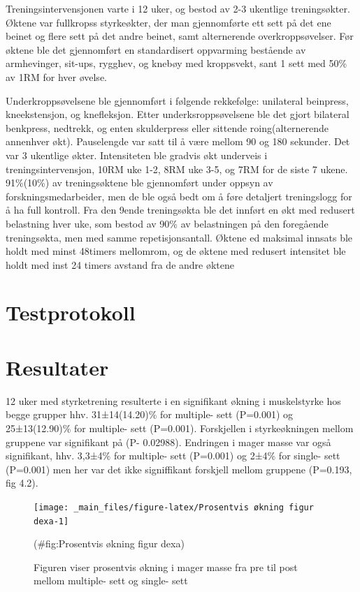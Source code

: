 \documentclass[
]{book}
\begin{document}
Treningsintervensjonen varte i 12 uker, og bestod av 2-3 ukentlige treningsøkter. Øktene var fullkropss styrkeøkter, der man gjennomførte ett sett på det ene beinet og flere sett på det andre beinet, samt alternerende overkroppsøvelser. Før øktene ble det gjennomført en standardisert oppvarming bestående av armhevinger, sit-ups, rygghev, og knebøy med kroppsvekt, sant 1 sett med 50\% av 1RM for hver øvelse.

Underkroppsøvelsene ble gjennomført i følgende rekkefølge: unilateral beinpress, kneekstensjon, og knefleksjon. Etter underksroppsøvelsene ble det gjort bilateral benkpress, nedtrekk, og enten skulderpress eller sittende roing(alternerende annenhver økt). Pauselengde var satt til å være mellom 90 og 180 sekunder. Det var 3 ukentlige økter. Intensiteten ble gradvis økt underveis i treningsintervensjon, 10RM uke 1-2, 8RM uke 3-5, og 7RM for de siste 7 ukene. 91\%(10\%) av treningsøktene ble gjennomført under oppsyn av forskningsmedarbeider, men de ble også bedt om å føre detaljert treningslogg for å ha full kontroll. Fra den 9ende treningsøkta ble det innført en økt med redusert belastning hver uke, som bestod av 90\% av belastningen på den foregående treningsøkta, men med samme repetisjonsantall. Øktene ed maksimal innsats ble holdt med minst 48timers mellomrom, og de øktene med redusert intensitet ble holdt med inst 24 timers avstand fra de andre øktene

\hypertarget{testprotokoll}{%
\section{Testprotokoll}\label{testprotokoll}}

\hypertarget{resultater-1}{%
\section{Resultater}\label{resultater-1}}

12 uker med styrketrening resulterte i en signifikant økning i muskelstyrke hos begge grupper hhv. 31±14(14.20)\% for multiple- sett (P=0.001) og 25±13(12.90)\% for multiple- sett (P=0.001). Forskjellen i styrkeøkningen mellom gruppene var signifikant på (P- 0.02988). Endringen i mager masse var også signifikant, hhv. 3,3±4\% for multiple- sett (P=0.001) og 2±4\% for single- sett (P=0.001) men her var det ikke signiffikant forskjell mellom gruppene (P=0.193, fig 4.2).

\begin{figure}
\texttt{[image: \_main\_files/figure-latex/Prosentvis økning figur dexa-1]} \caption{Figuren viser prosentvis økning i mager masse fra pre til post mellom multiple- sett og single- sett}(\#fig:Prosentvis økning figur dexa)
\end{figure}
\end{document}
